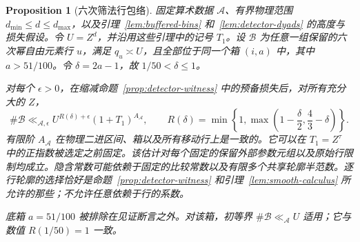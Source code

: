 \documentclass[11pt,a4paper]{article}
\numberwithin{equation}{section}
\numberwithin{figure}{section}
\newtheorem{proposition}[theorem]{Proposition}
\theoremstyle{definition}
\theoremstyle{remark}
\begin{document}
\begin{proposition}[六次筛法行包络]\label{prop:sextic-row-count}
固定算术数据 $\mathcal A$、有界物理范围 $d_{\min}\le d\le d_{\max}$，以及引理~\ref{lem:buffered-bins} 和~\ref{lem:detector-dyads} 的高度与损失假设。令 $U=Z^d$，并沿用这些引理中的记号 $T_1$。设 $\mathcal B$ 为任意一组保留的六次幂自由元素行 $u$，满足 $q_u\asymp U$，且全部位于同一个箱 $(i,a)$ 中，其中 $a>51/100$。令 $\delta=2a-1$，故 $1/50<\delta\le1$。

对每个 $\epsilon>0$，在缩减命题~\ref{prop:detector-witness} 中的预备损失后，对所有充分大的 $Z$，
\begin{equation}\label{eq:sextic-row-count}
 \#\mathcal B\ll_{\mathcal A,\epsilon}
 U^{R(\delta)+\epsilon}(1+T_1)^{A_{\mathcal A}},
 \qquad
 R(\delta)=\min\left\{1,
       \max\left(1-\frac\delta2,\frac43-\delta\right)\right\}.
\end{equation}
有限阶 $A_{\mathcal A}$ 在物理二进区间、箱以及所有移动行上是一致的。它可以在 $T_1=Z^\tau$ 中的正指数被选定之前固定。该估计对每个固定的保留外部参数元组以及原始行限制均成立。隐含常数可能依赖于固定的比较常数以及有限多个共享轮廓半范数。逐行轮廓的选择恰好是命题~\ref{prop:detector-witness} 和引理~\ref{lem:smooth-calculus} 所允许的那些；不允许任意依赖于行的系数。

底箱 $a=51/100$ 被排除在见证断言之外。对该箱，初等界 $\#\mathcal B\ll_{\mathcal A}U$ 适用；它与数值 $R(1/50)=1$ 一致。
\end{proposition}
\end{document}
